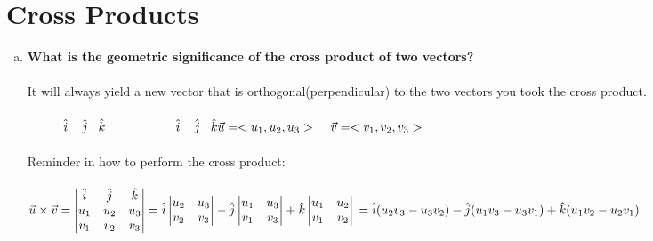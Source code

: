 \documentclass{article}
\begin{document}
\section{Cross Products}
\begin{enumerate}[a.]
	\item \textbf{What is the geometric significance of the cross product of two vectors?}\\
	      \\
	      It will always yield a new vector that is orthogonal(perpendicular) to the two vectors you took the cross product.\\
	      \\
	      
	      $\hspace{1cm}\hat{i}\hspace{.4cm}\hat{j}\hspace{.3cm}\hat{k}\hspace{2cm}\hat{i}\hspace{.4cm}\hat{j}\hspace{.3cm}\hat{k}\\\vec{u} = <u_{1},u_{2},u_{3}>\hspace{.4cm}\vec{v} = <v_{1},v_{2},v_{3}>$\\
	      \\
	      Reminder in how to perform the cross product:\\
	      \\
	      $\vec{u}\times\vec{v}=\begin{vmatrix}
	      \hat{i}&\hat{j}&\hat{k}\\
	      u_{1}&u_{2}&u_{3}\\
	      v_{1}&v_{2}&v_{3}\\
	\end{vmatrix}=\hat{i}
	\begin{vmatrix}
		u_{2} & u_{3} \\
		v_{2} & v_{3} \\
	\end{vmatrix}-\hat{j}\begin{vmatrix}
	u_{1}&u_{3}\\
	v_{1}&v_{3}\\
	\end{vmatrix}+\hat{k}\begin{vmatrix}
	u_{1}&u_{2}\\
	v_{1}&v_{2}\\
	\end{vmatrix}\\
	=\hat{i}(u_{2}v_{3}-u_{3}v_{2})-\hat{j}(u_{1}v_{3}-u_{3}v_{1})+\hat{k}(u_{1}v_{2}-u_{2}v_{1})$\\

\end{enumerate}
\end{document}
